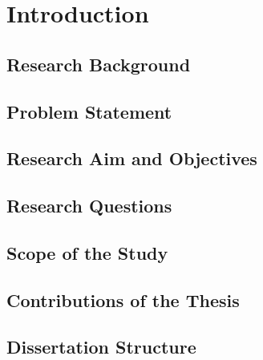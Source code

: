 \chapter{Introduction}
\section{Research Background}
\section{Problem Statement}
\section{Research Aim and Objectives}
\section{Research Questions}
\section{Scope of the Study}
\section{Contributions of the Thesis}
\section{Dissertation Structure}
